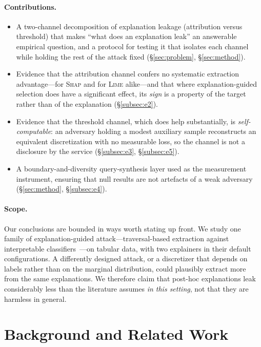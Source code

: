 \documentclass[sigconf,anonymous,review]{acmart}
\begin{document}
\paragraph{Contributions.}
\begin{itemize}
  \item A two-channel decomposition of explanation leakage (attribution versus threshold) that
  makes ``what does an explanation leak'' an answerable empirical question, and a protocol for
  testing it that isolates each channel while holding the rest of the attack fixed
  (\S\ref{sec:problem}, \S\ref{sec:method}).
  \item Evidence that the attribution channel confers no systematic extraction advantage---for
  \textsc{Shap} and for \textsc{Lime} alike---and that where explanation-guided selection does have a
  significant effect, its \emph{sign} is a property of the target rather than of the explanation
  (\S\ref{subsec:e2}).
  \item Evidence that the threshold channel, which does help substantially, is
  \emph{self-computable}: an adversary holding a modest auxiliary sample reconstructs an equivalent
  discretization with no measurable loss, so the channel is not a disclosure by the service
  (\S\ref{subsec:e3}, \S\ref{subsec:e5}).
  \item A boundary-and-diversity query-synthesis layer used as the measurement instrument, ensuring
  that null results are not artefacts of a weak adversary (\S\ref{sec:method}, \S\ref{subsec:e4}).
\end{itemize}

\paragraph{Scope.} Our conclusions are bounded in ways worth stating up front. We study one family of
explanation-guided attack---traversal-based extraction against interpretable
classifiers~\cite{oksuz2024autolycus}---on tabular data, with two explainers in their default
configurations. A differently designed attack, or a discretizer that depends on labels rather than on
the marginal distribution, could plausibly extract more from the same explanations. We therefore claim
that post-hoc explanations leak considerably less than the literature assumes \emph{in this setting},
not that they are harmless in general.

\section{Background and Related Work}
\label{sec:background}
\end{document}
